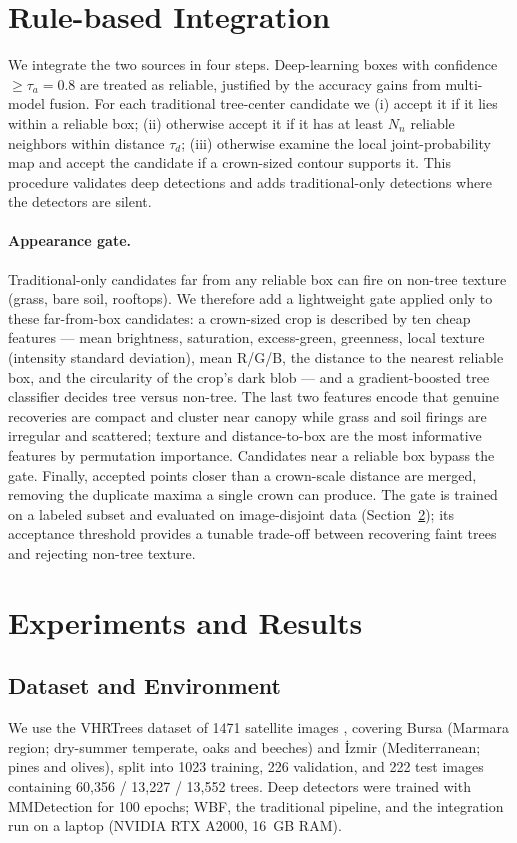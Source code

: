 \documentclass{article}
\begin{document}
\section{Rule-based Integration}\label{section:rule-based}

We integrate the two sources in four steps. Deep-learning boxes with confidence $\geq \tau_a = 0.8$ are treated as reliable, justified by the accuracy gains from multi-model fusion. For each traditional tree-center candidate we (i) accept it if it lies within a reliable box; (ii) otherwise accept it if it has at least $N_n$ reliable neighbors within distance $\tau_d$; (iii) otherwise examine the local joint-probability map and accept the candidate if a crown-sized contour supports it. This procedure validates deep detections and adds traditional-only detections where the detectors are silent.

\paragraph{Appearance gate.} Traditional-only candidates far from any reliable box can fire on non-tree texture (grass, bare soil, rooftops). We therefore add a lightweight gate applied only to these far-from-box candidates: a crown-sized crop is described by ten cheap features --- mean brightness, saturation, excess-green, greenness, local texture (intensity standard deviation), mean R/G/B, the distance to the nearest reliable box, and the circularity of the crop's dark blob --- and a gradient-boosted tree classifier decides tree versus non-tree. The last two features encode that genuine recoveries are compact and cluster near canopy while grass and soil firings are irregular and scattered; texture and distance-to-box are the most informative features by permutation importance. Candidates near a reliable box bypass the gate. Finally, accepted points closer than a crown-scale distance are merged, removing the duplicate maxima a single crown can produce. The gate is trained on a labeled subset and evaluated on image-disjoint data (Section~\ref{sec:results}); its acceptance threshold provides a tunable trade-off between recovering faint trees and rejecting non-tree texture.

\section{Experiments and Results}\label{sec:results}

\subsection{Dataset and Environment}
We use the VHRTrees dataset of 1471 satellite images \cite{10.3389/ffgc.2024.1495544}, covering Bursa (Marmara region; dry-summer temperate, oaks and beeches) and İzmir (Mediterranean; pines and olives), split into 1023 training, 226 validation, and 222 test images containing 60{,}356 / 13{,}227 / 13{,}552 trees. Deep detectors were trained with MMDetection \cite{chen2019mmdetection} for 100 epochs; WBF, the traditional pipeline, and the integration run on a laptop (NVIDIA RTX A2000, 16~GB RAM).
\end{document}
